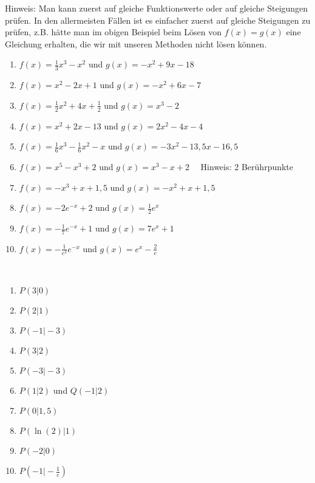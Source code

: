 \textcolor{loes}{Hinweis: Man kann zuerst auf gleiche Funktionswerte oder auf gleiche Steigungen prüfen. In den allermeisten Fällen ist es einfacher zuerst auf gleiche Steigungen zu prüfen, z.B. hätte man im obigen Beispiel beim Lösen von \(f(x)=g(x)\) eine Gleichung erhalten, die wir mit unseren Methoden nicht lösen können.}\newpage
\begin{Exercise}[title={\raggedright Bestimme jeweils den Berührpunkt der beiden Funktionen.}, label=beruehrpunkteA1]
	\begin{enumerate}[label=\alph*)]
		\item \(f(x)=\frac{1}{3}x^3-x^2\) und \(g(x)=-x^2+9x-18\)
		\item \(f(x)=x^2-2x+1\) und \(g(x)=-x^2+6x-7\)
		\item \(f(x)=\frac{1}{2}x^2+4x+\frac{1}{2}\) und \(g(x)=x^3-2\)
		\item \(f(x)=x^2+2x-13\) und \(g(x)=2x^2-4x-4\)
		\item \(f(x)=\frac{1}{6}x^3-\frac{1}{6}x^2-x\) und \(g(x)=-3x^2-13,5x-16,5\)
		\item \(f(x)=x^5-x^3+2\) und \(g(x)=x^3-x+2\quad\) Hinweis: 2 Berührpunkte
		\item \(f(x)=-x^3+x+1,5\) und \(g(x)=-x^2+x+1,5\)
		\item \(f(x)=-2e^{-x}+2\) und \(g(x)=\frac{1}{2}e^x\)
		\item \(f(x)=-\frac{1}{7}e^{-x}+1\) und \(g(x)=7e^x+1\)
		\item \(f(x)=-\frac{1}{e^2}e^{-x}\) und \(g(x)=e^x-\frac{2}{e}\)
	\end{enumerate}
\end{Exercise}
\begin{Answer}[ref=beruehrpunkteA1]\\
	\begin{enumerate}[label=\alph*)]
		\item \(P(3\vert0)\)
		\item \(P(2\vert1)\)
		\item \(P(-1\vert-3)\)
		\item \(P(3\vert2)\)
		\item \(P(-3\vert-3)\)
		\item \(P(1\vert2)\) und \(Q(-1\vert2)\)
		\item \(P(0\vert1,5)\)
		\item \(P(\ln(2)\vert1)\)
		\item \(P(-2\vert0)\)
		\item \(P\left(-1\vert-\frac{1}{e}\right)\)
	\end{enumerate}
\end{Answer}